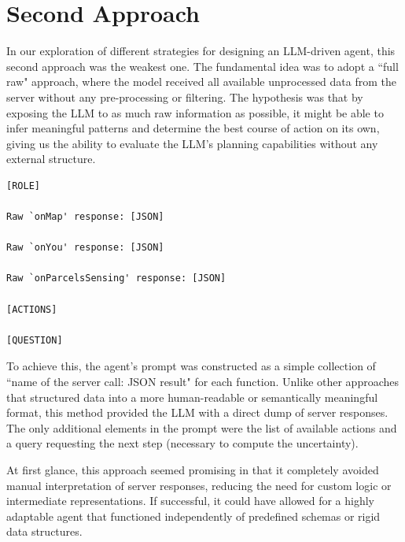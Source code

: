 \section{Second Approach}
\label{sec:second_approach}

In our exploration of different strategies for designing an LLM-driven agent,
this second approach was the weakest one. The fundamental idea was to adopt a ``full
raw" approach, where the model received all available unprocessed data from the server
without any pre-processing or filtering. The hypothesis was that by exposing the
LLM to as much raw information as possible, it might be able to infer meaningful
patterns and determine the best course of action on its own, giving us the
ability to evaluate the LLM's planning capabilities without any external
structure.
\vspace{1mm}
\begin{codewindow}
  [Text]  \begin{lstlisting}
[ROLE]

Raw `onMap' response: [JSON]

Raw `onYou' response: [JSON]

Raw `onParcelsSensing' response: [JSON]

[ACTIONS]

[QUESTION]
\end{lstlisting}
\end{codewindow}
\vspace{1mm}

To achieve this, the agent's prompt was constructed as a simple collection of ``name
of the server call: JSON result" for each function. Unlike other approaches that
structured data into a more human-readable or semantically meaningful format, this
method provided the LLM with a direct dump of server responses. The only
additional elements in the prompt were the list of available actions and a query
requesting the next step (necessary to compute the uncertainty).

At first glance, this approach seemed promising in that it completely avoided manual
interpretation of server responses, reducing the need for custom logic or
intermediate representations. If successful, it could have allowed for a highly
adaptable agent that functioned independently of predefined schemas or rigid
data structures.

